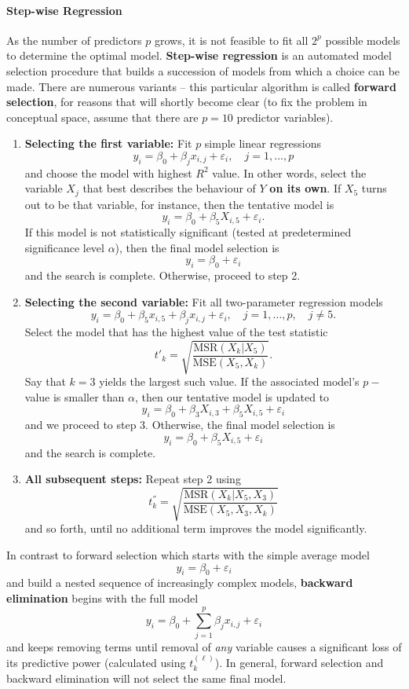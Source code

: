 \paragraph{Step-wise Regression}
As the number of predictors $p$ grows, it is not feasible to fit all $2^{p}$ possible models to determine the optimal model. \textbf{Step-wise regression} is an automated model selection procedure that builds a succession of models from which a choice can be made. There are numerous variants -- this particular algorithm is called \textbf{forward selection}, for reasons that will shortly become clear (to fix the problem in conceptual space, assume that there are $p=10$ predictor variables).
\begin{enumerate}
    \item \textbf{Selecting the first variable:} Fit $p$ simple linear regressions $$y_i=\beta_0 + \beta_jx_{i,j}+\varepsilon_i,\quad j=1,\ldots, p$$ and choose the model with highest $R^{2}$ value. In other words, select the variable $X_j$ that best describes the behaviour of $Y$ \textbf{on its own}. If $X_{5}$ turns out to be that variable, for instance, then the tentative model is $$y_{i}=\beta_{0}+\beta_{5}X_{i,5}+\varepsilon_{i}.$$ If this model is not statistically significant (tested at predetermined significance level $\alpha$), then the final model selection is $$y_{i}=\beta_{0}+\varepsilon_{i}$$ and the search is complete. Otherwise, proceed to step 2.
    \item \textbf{Selecting the second variable:} Fit all two-parameter regression models $$y_i=\beta_0 + \beta_5x_{i,5}+ \beta_jx_{i,j}+\varepsilon_i,\quad j=1,\ldots, p,\quad j\neq 5.$$ Select the model that has the highest value of the test statistic $$t{'}_{k}=\sqrt{\frac{\textrm{MSR}(X_{k}|X_{5})}{\textrm{MSE}(X_{5}, X_{k})}}.$$ Say that $k=3$ yields the largest such value. If the associated model's $p-$value is smaller than $\alpha$, then our tentative model is updated to $$y_{i}=\beta_{0}+\beta_{3}X_{i,3}+\beta_{5}X_{i,5}+\varepsilon_{i}$$ and we proceed to step 3. Otherwise, the final model selection is $$y_{i}=\beta_{0}+\beta_{5}X_{i,5}+\varepsilon_{i}$$ and the search is complete.  
    \item \textbf{All subsequent steps:} Repeat step 2 using $$t^{''}_k=\sqrt{\frac{\textrm{MSR}(X_{k}|X_{5},X_3)}{\textrm{MSE}(X_{5}, X_3,X_{k})}}$$ and so forth, until no additional term improves the model significantly.
\end{enumerate}
In contrast to forward selection which starts with the simple average model $$y_{i}=\beta_{0}+\varepsilon_{i}$$ and build a nested sequence of increasingly complex models, \textbf{backward elimination} begins with the full model $${y}_{i}=\beta_{0}+\sum_{j=1}^{p}\beta_{j}x_{i,j}+\varepsilon_{i}$$ and keeps removing terms until removal of \textit{any} variable causes a significant loss of its predictive power (calculated using $t^{(\ell)}_{k}$). In general, forward selection and backward elimination will not select the same final model. 
